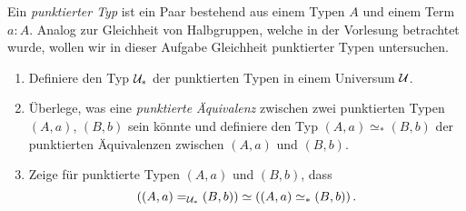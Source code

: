 \documentclass{uebung}
\begin{document}

\begin{exercise}
  Ein \emph{punktierter Typ} ist ein Paar bestehend aus einem Typen $A$ und einem Term $a:A$.
  Analog zur Gleichheit von Halbgruppen, welche in der Vorlesung betrachtet wurde, wollen wir in dieser Aufgabe Gleichheit punktierter Typen untersuchen.
  \begin{enumerate}
    \item Definiere den Typ $\mathcal{U}_*$ der punktierten Typen in einem Universum $\mathcal{U}$.
    \item Überlege, was eine \emph{punktierte Äquivalenz} zwischen zwei punktierten Typen $(A,a)$, $(B,b)$ sein könnte und definiere den Typ $(A,a) \simeq_* (B,b)$ der punktierten Äquivalenzen zwischen $(A,a)$ und $(B,b)$.
    \item Zeige für punktierte Typen $(A,a)$ und $(B,b)$, dass
      $$
      \left((A,a) =_{\mathcal{U}_*} (B,b)\right) \simeq \left((A,a) \simeq_* (B,b)\right).
      $$
  \end{enumerate}
\end{exercise}
\end{document}
